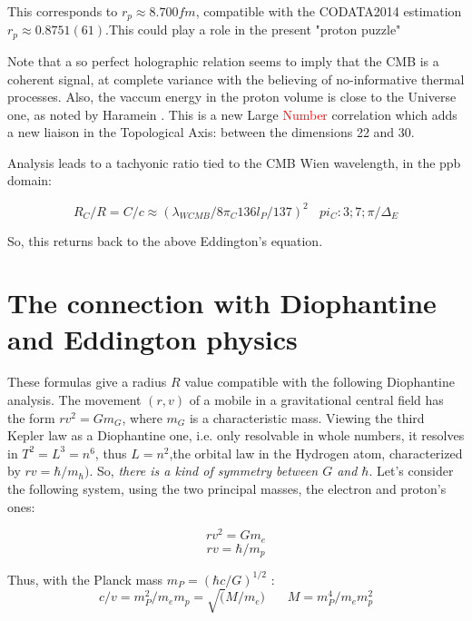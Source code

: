 \documentclass[a4paper,9pt]{article}
\begin{document}
This corresponds to $r_p \approx 8.700 fm$, compatible with the CODATA2014  estimation  $r_p \approx 0.8751(61)$.This could play a role in the present "proton puzzle" \cite{Val}  


Note that a so perfect holographic relation seems to imply that the CMB is a coherent signal, at complete variance with the believing of no-informative thermal processes. Also, the vaccum energy in the proton volume is close to the Universe one, as noted by Haramein \cite{Haramein}. This is a new Large \textcolor{red}{Number} correlation which adds a new liaison in the Topological Axis: between the dimensions 22 and 30.


Analysis leads to a tachyonic ratio tied to the CMB Wien wavelength, in the ppb domain: 

\begin{equation}
     R_C /R = C/c \approx (\lambda_{WCMB}/8\pi_C 136 l_P/137)^2    ~~~~ pi_C : 3; 7; \pi/\Delta_E
    \end{equation}

So, this returns back to the above Eddington's equation.


    \section{The connection with Diophantine and Eddington physics}

These formulas give a radius $R$ value compatible with the following Diophantine analysis. The movement $(r,v)$ of a mobile in a gravitational central field has the form $r v^2 = Gm_G$, where $m_G$ is a characteristic mass. Viewing the third Kepler law as a Diophantine one, i.e. only resolvable in whole numbers, it resolves in  $T^2 = L^3 = n^6$, thus $L = n^2$,the orbital law in the Hydrogen atom, characterized by $rv = \hbar/m_{\hbar})$. So, \textit{there is a kind of symmetry between $G$ and $\hbar$}. Let's consider the following system, using the two principal masses, the electron and proton's ones: 

\begin{equation}
  r v^2 = Gm_e
  \end{equation}
  \begin{equation}
r v = \hbar/m_p  
\end{equation}

Thus, with the Planck mass $m_P = (\hbar c/G)^{1/2}$ : 
\begin{equation}
c/v = m_P^2/m_em_p = \sqrt(M/m_e)~~~~~~~~   M = m_P^4/m_em_p^2
\end{equation}
\end{document}
